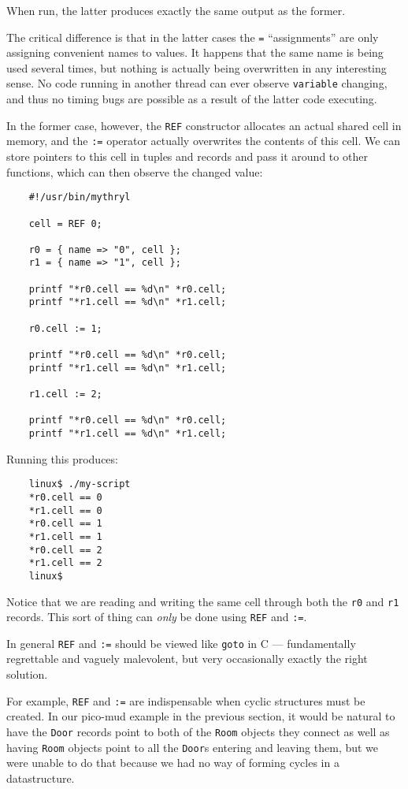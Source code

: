 When run, the latter produces exactly the same output as the 
former.

The critical difference is that in the latter 
cases the {\tt =} ``assignments'' are only assigning convenient 
names to values.  It happens that the same name is being used 
several times, but nothing is actually being overwritten in 
any interesting sense.  No code running in another thread can 
ever observe {\tt variable} changing, and thus no timing 
bugs are possible as a result of the latter code executing.

In the former case, however, the {\tt REF} 
constructor allocates an actual shared cell in memory, and the 
{\tt :=} operator actually overwrites the contents of this 
cell.  We can store pointers to this cell in tuples and 
records and pass it around to other functions, which can 
then observe the changed value:

\begin{verbatim}
    #!/usr/bin/mythryl

    cell = REF 0;

    r0 = { name => "0", cell };
    r1 = { name => "1", cell };

    printf "*r0.cell == %d\n" *r0.cell;
    printf "*r1.cell == %d\n" *r1.cell;

    r0.cell := 1;

    printf "*r0.cell == %d\n" *r0.cell;
    printf "*r1.cell == %d\n" *r1.cell;

    r1.cell := 2;

    printf "*r0.cell == %d\n" *r0.cell;
    printf "*r1.cell == %d\n" *r1.cell;
\end{verbatim}

Running this produces:

\begin{verbatim}
    linux$ ./my-script
    *r0.cell == 0
    *r1.cell == 0
    *r0.cell == 1
    *r1.cell == 1
    *r0.cell == 2
    *r1.cell == 2
    linux$
\end{verbatim}

Notice that we are reading and writing the same cell through 
both the {\tt r0} and {\tt r1} records.  This sort of thing 
can {\it only} be done using {\tt REF} and {\tt :=}.

In general {\tt REF} and {\tt :=} should be viewed like {\tt goto} 
in C --- fundamentally regrettable and vaguely malevolent, but 
very occasionally exactly the right solution.

For example, {\tt REF} and {\tt :=} are indispensable when cyclic 
structures must be created.   In our pico-mud example in the 
previous section, it would be natural to have the {\tt Door} 
records point to both of the {\tt Room} objects they connect 
as well as having {\tt Room} objects point to all the {\tt Door}s 
entering and leaving them, but we were unable to do that because 
we had no way of forming cycles in a datastructure.

